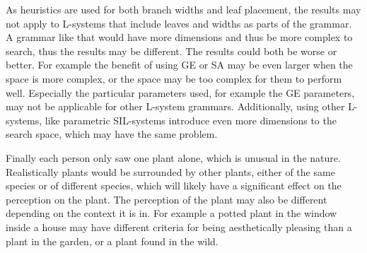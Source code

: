 As heuristics are used for both branch widths and leaf placement, the results may not apply to \glspl{L-system} that include leaves and widths as parts of the grammar.
A grammar like that would have more dimensions and thus be more complex to search, thus the results may be different.
The results could both be worse or better.
For example the benefit of using \gls{GE} or \gls{SA} may be even larger when the space is more complex, or the space may be too complex for them to perform well.
Especially the particular parameters used, for example the \gls{GE} parameters, may not be applicable for other \gls{L-system} grammars.
Additionally, using other \glspl{L-system}, like parametric SIL-systems introduce even more dimensions to the search space, which may have the same problem.

Finally each person only saw one plant alone, which is unusual in the nature.
Realistically plants would be surrounded by other plants, either of the same species or of different species, which will likely have a significant effect on the perception on the plant.
The perception of the plant may also be different depending on the context it is in.
For example a potted plant in the window inside a house may have different criteria for being aesthetically pleasing than a plant in the garden, or a plant found in the wild.

